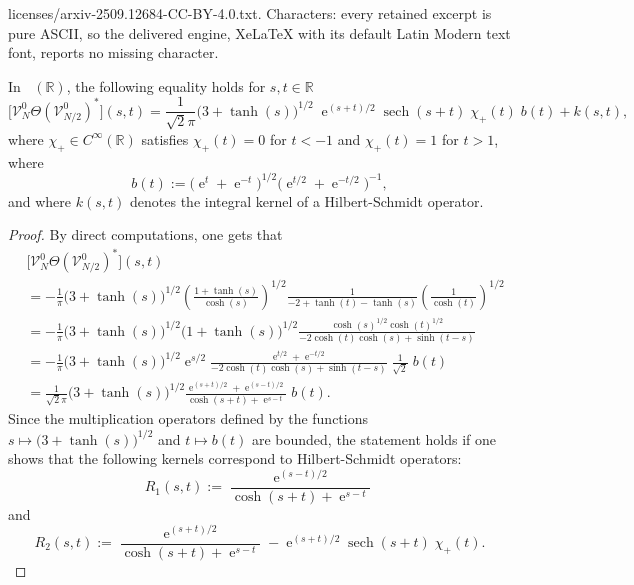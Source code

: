 \documentclass[10pt,a4paper]{amsart}
\def\R{\mathbb R}
\def\V{\mathcal V}
\def\e{\mathop{\mathrm{e}}\nolimits}
\def\ltwo{\mathop{\mathrm{L}^2}\nolimits}
\def\sech{\mathop{\mathrm{sech}}\nolimits}
\begin{document}
licenses/arxiv-2509.12684-CC-BY-4.0.txt. Characters: every retained excerpt is pure ASCII, so the delivered engine, XeLaTeX with its default Latin Modern text font, reports no missing character.
\begin{Lemma}
In $\ltwo(\R)$, the following equality holds for $s,t\in \R$
$$
\big[\V^0_N \Theta(\V^0_{N/2})^*\big](s,t)=
\frac{1}{\sqrt{2}\pi}\big(3+\tanh(s)\big)^{1/2}\;\!
\e^{(s+t)/2}\sech(s+t)\;\! \chi_+(t)\;\! b(t) + k(s,t),
$$
where $\chi_+\in C^\infty(\R)$ satisfies $\chi_+(t)=0$ for $t<-1$ and $\chi_+(t)=1$ for $t>1$, 
where
$$
b(t):=\big(\e^t+\e^{-t}\big)^{1/2}\big(\e^{t/2}+\e^{-t/2}\big)^{-1},
$$
and where $k(s,t)$ denotes the integral kernel of a Hilbert-Schmidt operator.
\end{Lemma}

\begin{proof}
By direct computations, one gets that
\begin{align*}
& \big[\V^0_N \Theta(\V^0_{N/2})^*\big](s,t)\\
& = -\frac{1}{\pi}\big(3+\tanh(s)\big)^{1/2} \left(\frac{1+\tanh(s)}{\cosh(s)}\right)^{1/2}
\frac{1}{-2+\tanh(t)-\tanh(s)}\left(\frac{1}{\cosh(t)}\right)^{1/2} \\
& = -\frac{1}{\pi}\big(3+\tanh(s)\big)^{1/2} \big(1+\tanh(s)\big)^{1/2}
\frac{\cosh(s)^{1/2}\cosh(t)^{1/2}}{-2\cosh(t)\cosh(s)+\sinh(t-s)} \\
& =  -\frac{1}{\pi}\big(3+\tanh(s)\big)^{1/2} \e^{s/2}
\frac{\e^{t/2}+\e^{-t/2}}{-2\cosh(t)\cosh(s)+\sinh(t-s)}\;\!\frac{1}{\sqrt{2}} \;\!b(t) \\
& =  \frac{1}{\sqrt{2}\pi}\big(3+\tanh(s)\big)^{1/2} 
\frac{\e^{(s+t)/2}+\e^{(s-t)/2}}{\cosh(s+t)+\e^{s-t}} \;\!b(t). 
\end{align*}
Since the multiplication operators defined by the functions
$s\mapsto \big(3+\tanh(s)\big)^{1/2}$ and $t\mapsto b(t)$
are bounded, the statement holds if one shows that the following kernels correspond
to Hilbert-Schmidt operators:
$$
R_1(s,t):=\frac{\e^{(s-t)/2}}{\cosh(s+t)+\e^{s-t}}
$$
and
$$
R_2(s,t):=\frac{\e^{(s+t)/2}}{\cosh(s+t)+\e^{s-t}} - \e^{(s+t)/2}\sech(s+t)\;\! \chi_+(t).
$$


\end{proof}
\end{document}
